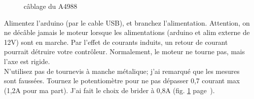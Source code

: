 \begin{figure}%
   \caption{\label{a4988_ampere} câblage du A4988}%
\end{figure}%
Alimentez l'arduino (par le cable USB), et branchez l'alimentation. Attention, on ne décâble jamais %
le moteur lorsque les alimentations (arduino et alim externe de 12V) sont en marche. Par l'effet de %
courants induits, un retour de courant pourrait détruire votre contrôleur. Normalement, le moteur %
ne tourne pas, mais l'axe est rigide. \\%
N'utilisez pas de tournevis à manche métalique; j'ai remarqué que les mesures sont faussées. Tournez le %
potentiomètre pour ne pas dépasser 0,7 courant max (1,2A pour ma part). J'ai fait le choix de brider %
à 0,8A (fig. \ref{a4988_ampere} page~\pageref{a4988_ampere}). %